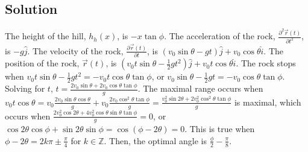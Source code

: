 \documentclass[solutions]{esg8012pset}
\begin{document}
\subsection*{Solution}
  The height of the hill, $h_h(x)$, is $-x\tan \phi$.  The acceleration of the rock, $\frac{\partial^2 \vec r(t)}{\partial t^2}$, is $-g\hat j$.  The velocity of the rock, $\frac{\partial \vec r(t)}{\partial t}$, is $(v_0\sin\theta -gt)\hat j + v_0\cos\theta \hat i$.  The position of the rock, $\vec r(t)$, is $\left(v_0 t\sin\theta -\frac{1}{2}gt^2\right)\hat j + v_0 t\cos\theta \hat i$.  The rock stops when $v_0 t\sin\theta -\frac{1}{2}gt^2 = -v_0 t \cos\theta\tan \phi$, or $v_0\sin\theta -\frac{1}{2}gt = -v_0 \cos\theta\tan \phi$.  Solving for $t$, $t = \frac{2v_0\sin\theta + 2v_0 \cos\theta\tan \phi}{g}$.  The maximal range occurs when $v_0 t\cos\theta = v_0 \frac{2v_0\sin\theta\cos\theta}{g} + v_0\frac{2v_0 \cos^2\theta\tan \phi}{g} = \frac{v_0^2\sin2\theta + 2v_0^2 \cos^2\theta\tan \phi}{g}$ is maximal, which occurs when $\frac{2v_0^2\cos2\theta + 4v_0^2 \cos\theta\sin\theta\tan \phi}{g} = 0$, or $\cos2\theta\cos\phi + \sin2\theta\sin \phi = \cos(\phi - 2\theta) = 0$.  This is true when $\phi - 2\theta = 2k\pi \pm \frac{\pi}{4}$ for $k\in\mathbb{Z}$.  Then, the optimal angle is $\frac{\phi}{2} - \frac{\pi}{8}$.
\end{document}
